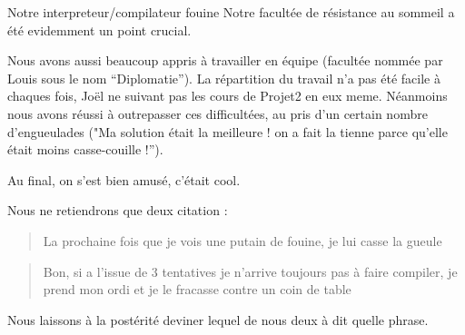 \documentclass[a4paper,10pt]{report}
\begin{document}
\begin{section}{Notre interpreteur/compilateur fouine}
Notre facultée de résistance au sommeil a été evidemment un point crucial.

Nous avons aussi beaucoup appris à travailler en équipe (facultée nommée par Louis sous le nom ``Diplomatie''). La répartition du travail n'a pas été facile à chaques fois, Jo\"el ne suivant pas les cours de Projet2 en eux meme. Néanmoins nous avons réussi à outrepasser ces difficultées, au pris d'un certain nombre d'engueulades ("Ma solution était la meilleure ! on a fait la tienne parce qu'elle était moins casse-couille !'').

Au final, on s'est bien amusé, c'était cool.

Nous ne retiendrons que deux citation : 

\begin{quote}
La prochaine fois que je vois une putain de fouine, je lui casse la gueule
\end{quote}

\begin{quote}
Bon, si a l'issue de 3 tentatives je n'arrive toujours pas à faire compiler, je prend mon ordi et je le fracasse contre un coin de table
\end{quote}

Nous laissons à la postérité deviner lequel de nous deux à dit quelle phrase.

\end{section}



\end{document}
